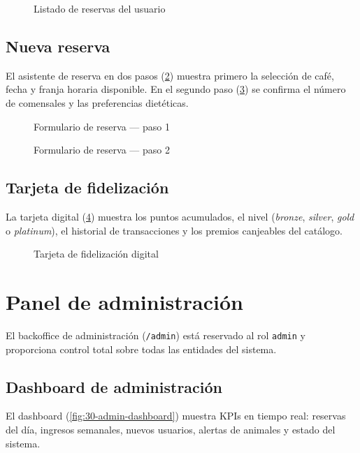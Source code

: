 \documentclass[12pt,a4paper,twoside,openright]{report}
\begin{document}
\begin{figure}[H]
  \centering
  \fbox{\rule{0pt}{6cm}\rule{12cm}{0pt}}
  \caption{Listado de reservas del usuario}
  \label{fig:22-mis-reservas}
\end{figure}

\subsection{Nueva reserva}
El asistente de reserva en dos pasos (\cref{fig:23-reservar-step1}) muestra
primero la selección de café, fecha y franja horaria disponible. En el segundo
paso (\cref{fig:24-reservar-step2}) se confirma el número de comensales y las
preferencias dietéticas.

\begin{figure}[H]
  \centering
  \fbox{\rule{0pt}{6cm}\rule{12cm}{0pt}}
  \caption{Formulario de reserva — paso 1}
  \label{fig:23-reservar-step1}
\end{figure}

\begin{figure}[H]
  \centering
  \fbox{\rule{0pt}{6cm}\rule{12cm}{0pt}}
  \caption{Formulario de reserva — paso 2}
  \label{fig:24-reservar-step2}
\end{figure}

\subsection{Tarjeta de fidelización}
La tarjeta digital (\cref{fig:26-loyalty-card}) muestra los puntos acumulados,
el nivel (\textit{bronze}, \textit{silver}, \textit{gold} o \textit{platinum}), el historial de
transacciones y los premios canjeables del catálogo.

\begin{figure}[H]
  \centering
  \fbox{\rule{0pt}{6cm}\rule{12cm}{0pt}}
  \caption{Tarjeta de fidelización digital}
  \label{fig:26-loyalty-card}
\end{figure}

\section{Panel de administración}
\label{sec:manual-admin}

El backoffice de administración (\texttt{/admin}) está reservado al rol
\texttt{admin} y proporciona control total sobre todas las entidades del sistema.

\subsection{Dashboard de administración}
El dashboard (\cref{fig:30-admin-dashboard}) muestra KPIs en tiempo real:
reservas del día, ingresos semanales, nuevos usuarios, alertas de animales y
estado del sistema.
\end{document}
